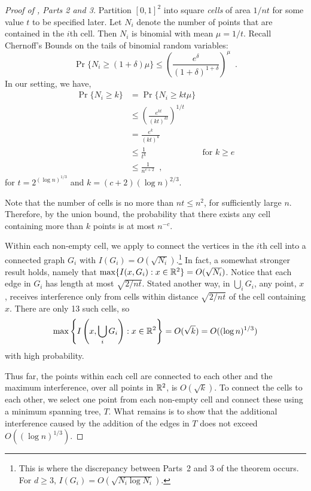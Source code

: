 \documentclass{patmorin}
\begin{document}
\begin{proof}[Proof of , Parts 2 and 3]
Partition $[0,1]^2$ into square \emph{cells} of area $1/nt$ for some
value $t$ to be specified later.  Let $N_i$ denote the number of points
that are contained in the $i$th cell.  Then $N_i$ is binomial
with mean $\mu=1/t$.  Recall Chernoff's Bounds \cite{c52} on the tails
of binomial random variables:
\[
  \Pr\{N_i \ge (1+\delta)\mu\} 
    \le \left(\frac{e^\delta}{(1+\delta)^{1+\delta}}\right)^\mu \enspace .
\]
In our setting, we have, 
\begin{align*}
  \Pr\{N_i \ge k\} 
    & = \Pr\{N_i \ge kt\mu\} \\
    & \le \left(\frac{e^{kt}}{(kt)^{kt}}\right)^{1/t} \\
    & = \frac{e^{k}}{(kt)^{k}} \\
    & \le \frac{1}{t^{k}} & \text{for $k\ge e$} \\
    & \le \frac{1}{n^{c+2}} \enspace , 
\end{align*}
for $t=2^{(\log n)^{1/3}}$ and $k=(c+2)(\log n)^{2/3}$.

Note that the number of cells is no more than $nt\le
n^2$, for sufficiently large $n$.  Therefore, by the union bound, the
probability that there exists any cell containing more than $k$ points
is at most $n^{-c}$.

Within each non-empty cell, we apply  to
connect the vertices in the $i$th cell into a connected graph $G_i$
with $I(G_i)=O(\sqrt{N_i})$.\footnote{This is where the discrepancy between Parts~2 and 3 of the theorem occurs.  For $d\ge 3$, $I(G_i)=O(\sqrt{N_i\log N_i})$.}  In fact, a somewhat stronger result holds,
namely that $\max\{I(x,G_i) : x\in\mathbb{R}^2\}=O(\sqrt{N_i})$.  Notice that
each edge in $G_i$ has length at most $\sqrt{2/nt}$.  Stated another
way, in $\bigcup_i G_i$, any point, $x$, receives interference only
from cells within distance $\sqrt{2/nt}$ of the cell containing $x$.
There are only 13 such cells, so
\[
  \max\left\{I\left(x,\bigcup_iG_i\right) : x\in\mathbb{R}^2\right\}=O(\sqrt{k}) 
    = O((\log n)^{1/3})
\]
with high probability.

Thus far, the points within each cell are connected to each other and
the maximum interference, over all points in $\mathbb{R}^2$, is $O(\sqrt{k})$.
To connect the cells to each other, we select one point from each
non-empty cell and connect these using a minimum spanning tree, $T$.
What remains is to show that the additional interference caused by the
addition of the edges in $T$ does not exceed $O((\log n)^{1/3})$.


\end{proof}
\end{document}
